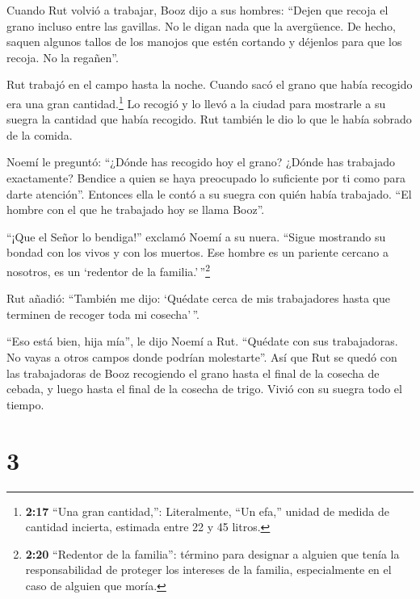  Cuando Rut volvió a trabajar, Booz dijo a sus hombres:
``Dejen que recoja el grano incluso entre las gavillas. No le digan nada
que la avergüence.  De hecho, saquen algunos tallos de los
manojos que estén cortando y déjenlos para que los recoja. No la
regañen''.

 Rut trabajó en el campo hasta la noche. Cuando sacó el
grano que había recogido era una gran cantidad.\footnote{\textbf{2:17}
  ``Una gran cantidad,'': Literalmente, ``Un efa,'' unidad de medida de
  cantidad incierta, estimada entre 22 y 45 litros.}  Lo
recogió y lo llevó a la ciudad para mostrarle a su suegra la cantidad
que había recogido. Rut también le dio lo que le había sobrado de la
comida.

 Noemí le preguntó: ``¿Dónde has recogido hoy el grano?
¿Dónde has trabajado exactamente? Bendice a quien se haya preocupado lo
suficiente por ti como para darte atención''. Entonces ella le contó a
su suegra con quién había trabajado. ``El hombre con el que he trabajado
hoy se llama Booz''.

 ``¡Que el Señor lo bendiga!'' exclamó Noemí a su nuera.
``Sigue mostrando su bondad con los vivos y con los muertos. Ese hombre
es un pariente cercano a nosotros, es un `redentor de la
familia.'\,''\footnote{\textbf{2:20} ``Redentor de la familia'': término
  para designar a alguien que tenía la responsabilidad de proteger los
  intereses de la familia, especialmente en el caso de alguien que
  moría.}

 Rut añadió: ``También me dijo: `Quédate cerca de mis
trabajadores hasta que terminen de recoger toda mi cosecha'\,''.

 ``Eso está bien, hija mía'', le dijo Noemí a Rut.
``Quédate con sus trabajadoras. No vayas a otros campos donde podrían
molestarte''.  Así que Rut se quedó con las trabajadoras de
Booz recogiendo el grano hasta el final de la cosecha de cebada, y luego
hasta el final de la cosecha de trigo. Vivió con su suegra todo el
tiempo.

\hypertarget{section-2}{%
\section{3}\label{section-2}}

